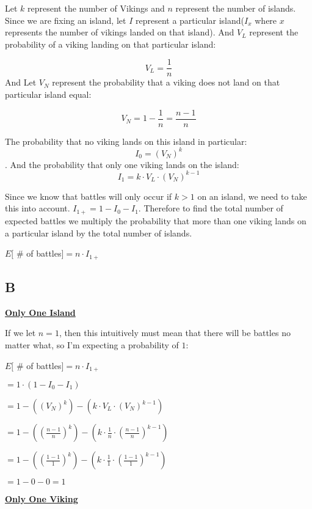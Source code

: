 \documentclass[12pt]{article}
\begin{document}
Let $k$ represent the number of Vikings and $n$ represent the number of islands.
Since we are fixing an island, let $I$ represent a particular island($I_{x}$ where $x$ represents the number of vikings landed on that island). And $V_{L}$ represent the probability of a viking landing on that particular island:

$$V_{L} = \frac{1}{n}$$
And Let $V_{N}$ represent the probability that a viking does not land on that particular island equal:

$$V_{N} = 1-\frac{1}{n} = \frac{n-1}{n}$$

The probability that no viking lands on this island in particular: $$I_{0} = (V_{N})^{k}$$. And the probability that only one viking lands on the island: $$I_{1} = k \cdot V_{L} \cdot (V_{N})^{k-1}$$

Since we know that battles will only occur if $k > 1$ on an island, we need to take this into account. $I_{1+} = 1 -  I_{0} -I_{1}$. Therefore to find the total number of expected battles we multiply the probability that more than one viking lands on a particular island by the total number of islands.

\begin{center}
$E[$ \# of battles$] = n \cdot I_{1+}$
\end{center}

\subsection{B}

\textbf{\underline{Only One Island}}

If we let $n=1$, then this intuitively must mean that there will be battles no matter what, so I'm expecting a probability of $1$:

\begin{center}
$E[$ \# of battles$] = n \cdot I_{1+}$

$ = 1 \cdot (1 -  I_{0} -I_{1})$

$ = 1 - ((V_{N})^{k}) - (k \cdot V_{L} \cdot (V_{N})^{k-1}) $

$ = 1 - ((\frac{n-1}{n})^{k}) - (k \cdot \frac{1}{n} \cdot (\frac{n-1}{n})^{k-1})$

$ = 1 - ((\frac{1-1}{1})^{k}) - (k \cdot \frac{1}{1} \cdot (\frac{1-1}{1})^{k-1})$

$ = 1 - 0 - 0 = 1$

\end{center}

\textbf{\underline{Only One Viking}}
\end{document}
